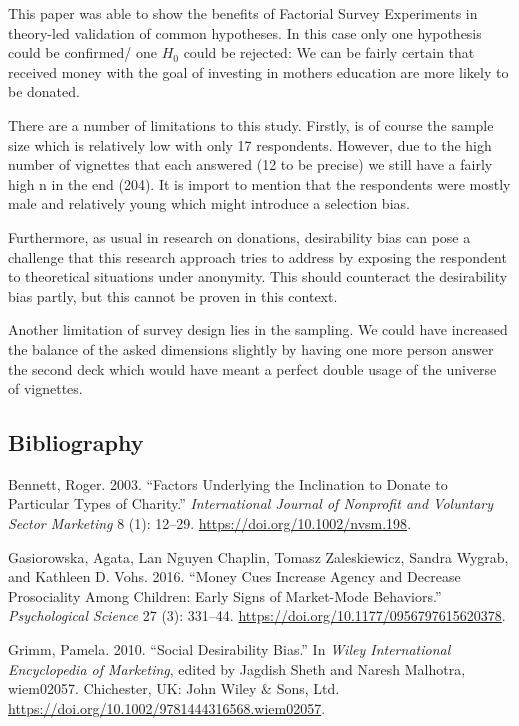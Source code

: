 \documentclass[
  12pt,
]{article}
\begin{document}
This paper was able to show the benefits of Factorial Survey Experiments
in theory-led validation of common hypotheses. In this case only one
hypothesis could be confirmed/ one \(H_0\) could be rejected: We can be
fairly certain that received money with the goal of investing in mothers
education are more likely to be donated.

There are a number of limitations to this study. Firstly, is of course
the sample size which is relatively low with only 17 respondents.
However, due to the high number of vignettes that each answered (12 to
be precise) we still have a fairly high n in the end (204). It is import
to mention that the respondents were mostly male and relatively young
which might introduce a selection bias.

Furthermore, as usual in research on donations, desirability bias can
pose a challenge that this research approach tries to address by
exposing the respondent to theoretical situations under anonymity. This
should counteract the desirability bias partly, but this cannot be
proven in this context.

Another limitation of survey design lies in the sampling. We could have
increased the balance of the asked dimensions slightly by having one
more person answer the second deck which would have meant a perfect
double usage of the universe of vignettes.

\hypertarget{bibliography}{%
\subsection*{Bibliography}\label{bibliography}}

\hypertarget{refs}{}
\leavevmode\hypertarget{ref-bennettFactorsUnderlyingInclination2003}{}%
Bennett, Roger. 2003. ``Factors Underlying the Inclination to Donate to
Particular Types of Charity.'' \emph{International Journal of Nonprofit
and Voluntary Sector Marketing} 8 (1): 12--29.
\url{https://doi.org/10.1002/nvsm.198}.

\leavevmode\hypertarget{ref-gasiorowskaMoneyCuesIncrease2016}{}%
Gasiorowska, Agata, Lan Nguyen Chaplin, Tomasz Zaleskiewicz, Sandra
Wygrab, and Kathleen D. Vohs. 2016. ``Money Cues Increase Agency and
Decrease Prosociality Among Children: Early Signs of Market-Mode
Behaviors.'' \emph{Psychological Science} 27 (3): 331--44.
\url{https://doi.org/10.1177/0956797615620378}.

\leavevmode\hypertarget{ref-grimmSocialDesirabilityBias2010}{}%
Grimm, Pamela. 2010. ``Social Desirability Bias.'' In \emph{Wiley
International Encyclopedia of Marketing}, edited by Jagdish Sheth and
Naresh Malhotra, wiem02057. Chichester, UK: John Wiley \& Sons, Ltd.
\url{https://doi.org/10.1002/9781444316568.wiem02057}.
\end{document}
